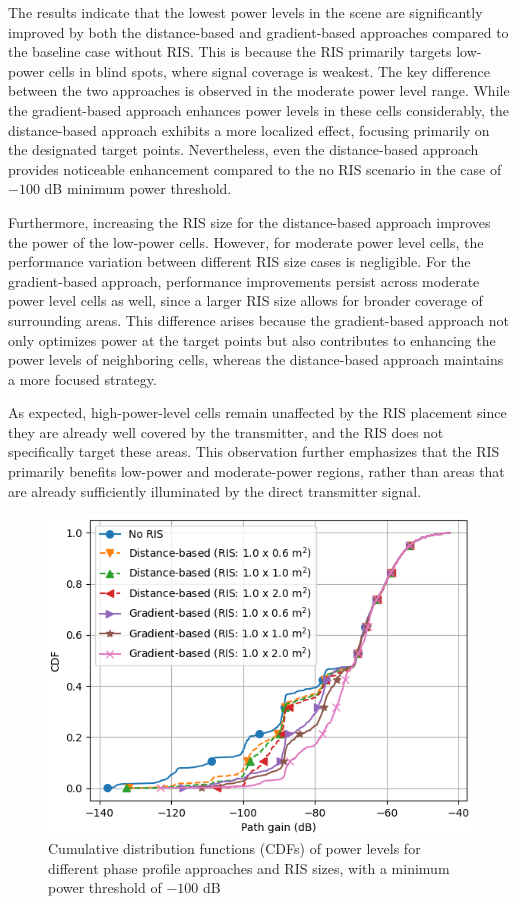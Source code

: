 \documentclass{IEEEoj}
\begin{document}
The results indicate that the lowest power levels in the scene are significantly improved by both the distance-based and gradient-based approaches compared to the baseline case without RIS. This is because the RIS primarily targets low-power cells in blind spots, where signal coverage is weakest. The key difference between the two approaches is observed in the moderate power level range. While the gradient-based approach enhances power levels in these cells considerably, the distance-based approach exhibits a more localized effect, focusing primarily on the designated target points. Nevertheless, even the distance-based approach provides noticeable enhancement compared to the no RIS scenario in the case of $-100$ dB minimum power threshold.

Furthermore, increasing the RIS size for the distance-based approach improves the power of the low-power cells. However, for moderate power level cells, the performance variation between different RIS size cases is negligible. For the gradient-based approach, performance improvements persist across moderate power level cells as well, since a larger RIS size allows for broader coverage of surrounding areas. This difference arises because the gradient-based approach not only optimizes power at the target points but also contributes to enhancing the power levels of neighboring cells, whereas the distance-based approach maintains a more focused strategy.

As expected, high-power-level cells remain unaffected by the RIS placement since they are already well covered by the transmitter, and the RIS does not specifically target these areas. This observation further emphasizes that the RIS primarily benefits low-power and moderate-power regions, rather than areas that are already sufficiently illuminated by the direct transmitter signal.

\begin{figure}
	\centering \includegraphics[width=\linewidth]{Sim_Results/CDF_-100dB.png}
	\caption{Cumulative distribution functions (CDFs) of power levels for different phase profile approaches and RIS sizes, with a minimum power threshold of $-100$ dB}
	\label{CDF_-100dB}
\end{figure}
\end{document}
